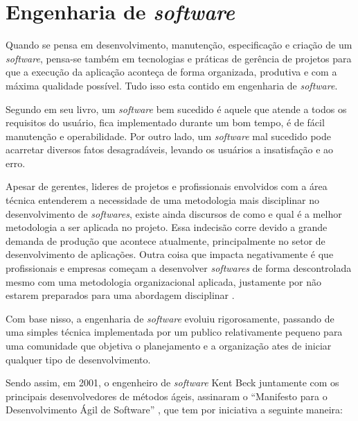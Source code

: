 \section{\textbf{{Engenharia de \textit{software}}}}
\label{engenharia-software}

Quando se pensa em desenvolvimento, manutenção, especificação e criação de um \textit{software}, pensa-se também em tecnologias e práticas de gerência de projetos para que a execução da aplicação aconteça de forma organizada, produtiva e com a máxima qualidade possível. Tudo isso esta contido em engenharia de \textit{software}.

Segundo  em seu livro, um \textit{software} bem sucedido é aquele que atende a todos os requisitos do usuário, fica implementado durante um bom tempo, é de fácil manutenção e operabilidade. Por outro lado, um \textit{software} mal sucedido pode acarretar diversos fatos desagradáveis, levando os usuários a insatisfação e ao erro. 

Apesar de gerentes, lideres de projetos e profissionais envolvidos com a área técnica entenderem a necessidade de uma metodologia mais disciplinar no desenvolvimento de \textit{softwares}, existe ainda discursos de como e qual é a melhor metodologia a ser aplicada no projeto. Essa indecisão corre devido a grande demanda de produção que acontece atualmente, principalmente no setor de desenvolvimento de aplicações. Outra coisa que impacta negativamente é que profissionais e empresas começam a desenvolver \textit{softwares} de forma descontrolada mesmo com uma metodologia organizacional aplicada, justamente por não estarem preparados para uma abordagem disciplinar \cite{PRESSMAN2016}. 

Com base nisso, a engenharia de \textit{software} evoluiu rigorosamente, passando de uma simples técnica implementada por um publico relativamente pequeno para uma comunidade que objetiva o planejamento e a organização ates de iniciar qualquer tipo de desenvolvimento.

Sendo assim, em 2001, o engenheiro de \textit{software} Kent Beck juntamente com os principais
desenvolvedores de métodos ágeis, assinaram o “Manifesto para o Desenvolvimento Ágil de Software” \cite{SOMMERVILLE2011}, que tem por iniciativa a seguinte maneira:

